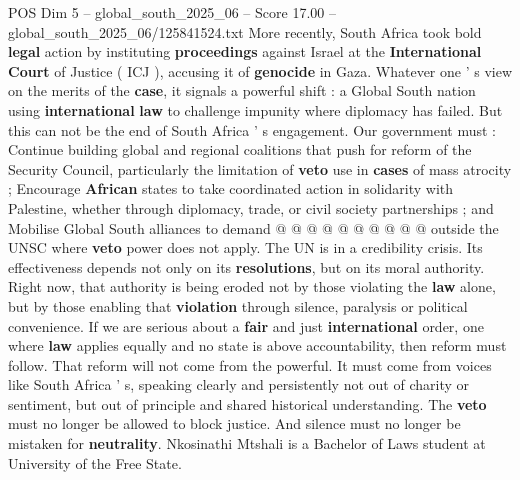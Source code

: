 \begin{textsample}{POS Dim 5 – global\_south\_2025\_06 – Score 17.00 – global\_south\_2025\_06/125841524.txt}
More recently, South Africa took bold \textbf{legal} action by instituting \textbf{proceedings} against Israel at the \textbf{International} \textbf{Court} of Justice ( ICJ ), accusing it of \textbf{genocide} in Gaza.
Whatever one ' s view on the merits of the \textbf{case}, it signals a powerful shift : a Global South nation using \textbf{international} \textbf{law} to challenge impunity where diplomacy has failed.
But this can not be the end of South Africa ' s engagement.
Our government must : Continue building global and regional coalitions that push for reform of the Security Council, particularly the limitation of \textbf{veto} use in \textbf{cases} of mass atrocity ; Encourage \textbf{African} states to take coordinated action in solidarity with Palestine, whether through diplomacy, trade, or civil society partnerships ; and Mobilise Global South alliances to demand @ @ @ @ @ @ @ @ @ @ outside the UNSC where \textbf{veto} power does not apply.
The UN is in a credibility crisis.
Its effectiveness depends not only on its \textbf{resolutions}, but on its moral authority.
Right now, that authority is being eroded not by those violating the \textbf{law} alone, but by those enabling that \textbf{violation} through silence, paralysis or political convenience.
If we are serious about a \textbf{fair} and just \textbf{international} order, one where \textbf{law} applies equally and no state is above accountability, then reform must follow.
That reform will not come from the powerful.
It must come from voices like South Africa ' s, speaking clearly and persistently not out of charity or sentiment, but out of principle and shared historical understanding.
The \textbf{veto} must no longer be allowed to block justice.
And silence must no longer be mistaken for \textbf{neutrality}.
Nkosinathi Mtshali is a Bachelor of Laws student at University of the Free State.

\end{textsample}
